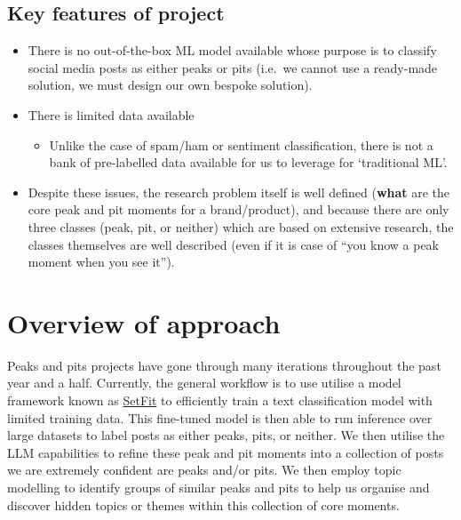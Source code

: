 \documentclass[
  letterpaper,
  DIV=11,
  numbers=noendperiod]{scrreprt}
\providecommand{\tightlist}{%
  \setlength{\itemsep}{0pt}\setlength{\parskip}{0pt}}\usepackage{longtable,booktabs,array}
\begin{document}
\subsection{Key features of project}\label{key-features-of-project}

\begin{itemize}
\tightlist
\item
  There is no out-of-the-box ML model available whose purpose is to
  classify social media posts as either peaks or pits (i.e.~we cannot
  use a ready-made solution, we must design our own bespoke solution).
\item
  There is limited data available

  \begin{itemize}
  \tightlist
  \item
    Unlike the case of spam/ham or sentiment classification, there is
    not a bank of pre-labelled data available for us to leverage for
    `traditional ML'.
  \end{itemize}
\item
  Despite these issues, the research problem itself is well defined
  (\textbf{what} are the core peak and pit moments for a brand/product),
  and because there are only three classes (peak, pit, or neither) which
  are based on extensive research, the classes themselves are well
  described (even if it is case of ``you know a peak moment when you see
  it'').
\end{itemize}

\section{Overview of approach}\label{overview-of-approach}

Peaks and pits projects have gone through many iterations throughout the
past year and a half. Currently, the general workflow is to use utilise
a model framework known as
\href{https://huggingface.co/docs/setfit/conceptual_guides/setfit}{SetFit}
to efficiently train a text classification model with limited training
data. This fine-tuned model is then able to run inference over large
datasets to label posts as either peaks, pits, or neither. We then
utilise the LLM capabilities to refine these peak and pit moments into a
collection of posts we are extremely confident are peaks and/or pits. We
then employ topic modelling to identify groups of similar peaks and pits
to help us organise and discover hidden topics or themes within this
collection of core moments.
\end{document}
